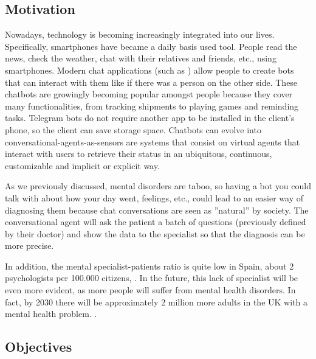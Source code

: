 \documentclass[12pt,english]{article}
\begin{document}
\subsection{Motivation}

Nowadays, technology is becoming increasingly integrated into our lives. Specifically, smartphones have became a daily basis used tool. People read the news, check the weather, chat with their relatives and friends, etc., using smartphones. Modern chat applications (such as \cite{Telegram}) allow people to create bots that can interact with them like if there was a person on the other side. These chatbots are growingly becoming popular amongst people because they cover many functionalities, from tracking shipments to playing games and reminding tasks. Telegram bots do not require another app to be installed in the client's phone, so the client can save storage space. Chatbots can evolve into conversational-agents-as-sensors are systems that consist on virtual agents that interact with users to retrieve their status in an ubiquitous, continuous, customizable and implicit or explicit way.

As we previously discussed, mental disorders are taboo, so having a bot you could talk with about how your day went, feelings, etc., could lead to an easier way of diagnosing them because chat conversations are seen as ''natural'' by society. The conversational agent will ask the patient a batch of questions (previously defined by their doctor) and show the data to the specialist so that the diagnosis can be more precise.

In addition, the mental specialist-patients ratio is quite low in Spain, about 2 psychologists per 100.000 citizens, \cite{elmundo}. In the future, this lack of specialist will be even more evident, as more people will suffer from mental health disorders. In fact, by 2030 there will be approximately 2 million more adults in the UK with a mental health problem. \cite{nhs}.

\subsection{Objectives}
\end{document}
